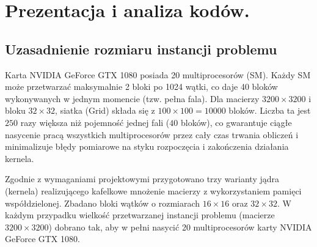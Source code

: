 \documentclass[10pt]{article}
\begin{document}
\newpage
\section{Prezentacja i analiza kodów.}

\subsection*{Uzasadnienie rozmiaru instancji problemu}
Karta NVIDIA GeForce GTX 1080 posiada 20 multiprocesorów (SM). Każdy SM może przetwarzać maksymalnie 2 bloki po 1024 wątki, co daje 40 bloków wykonywanych w jednym momencie (tzw. pełna fala). Dla macierzy $3200 \times 3200$ i bloku $32 \times 32$, siatka (Grid) składa się z $100 \times 100 = 10000$ bloków. Liczba ta jest $250$ razy większa niż pojemność jednej fali ($40$ bloków), co gwarantuje ciągłe nasycenie pracą wszystkich multiprocesorów przez cały czas trwania obliczeń i minimalizuje błędy pomiarowe na styku rozpoczęcia i zakończenia działania kernela.

Zgodnie z wymaganiami projektowymi przygotowano trzy warianty jądra (kernela) realizującego kafelkowe mnożenie macierzy z wykorzystaniem pamięci współdzielonej. Zbadano bloki wątków o rozmiarach $16 \times 16$ oraz $32 \times 32$. W każdym przypadku wielkość przetwarzanej instancji problemu (macierze $3200 \times 3200$) dobrano tak, aby w pełni nasycić 20 multiprocesorów karty NVIDIA GeForce GTX 1080.
\end{document}
